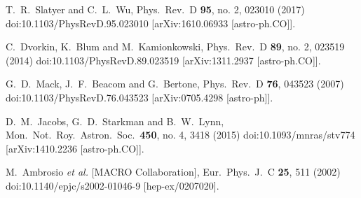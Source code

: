   T.~R.~Slatyer and C.~L.~Wu,
  Phys.\ Rev.\ D {\bf 95}, no. 2, 023010 (2017)
  doi:10.1103/PhysRevD.95.023010
  [arXiv:1610.06933 [astro-ph.CO]].
  
  C.~Dvorkin, K.~Blum and M.~Kamionkowski,
  Phys.\ Rev.\ D {\bf 89}, no. 2, 023519 (2014)
  doi:10.1103/PhysRevD.89.023519
  [arXiv:1311.2937 [astro-ph.CO]].
  
  G.~D.~Mack, J.~F.~Beacom and G.~Bertone,
  Phys.\ Rev.\ D {\bf 76}, 043523 (2007)
  doi:10.1103/PhysRevD.76.043523
  [arXiv:0705.4298 [astro-ph]].

  D.~M.~Jacobs, G.~D.~Starkman and B.~W.~Lynn,
  Mon.\ Not.\ Roy.\ Astron.\ Soc.\  {\bf 450}, no. 4, 3418 (2015)
  doi:10.1093/mnras/stv774
  [arXiv:1410.2236 [astro-ph.CO]].
  
  M.~Ambrosio {\it et al.} [MACRO Collaboration],
  Eur.\ Phys.\ J.\ C {\bf 25}, 511 (2002)
  doi:10.1140/epjc/s2002-01046-9
  [hep-ex/0207020].

